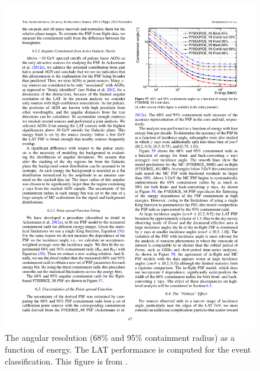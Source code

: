 \begin{figure}[htbp]
  \centering
  \includegraphics{chapters/introduction/figures/lat_psf.pdf}
  \caption{
  The angular resolution (68\% and 95\% containment radius)
  as a function of energy.
  The \ac{LAT} performance is computed for the \psevensourcevsix
  event classification.
  This figure is from \cite{ackermann_2012a_fermi-large}.
  }
\end{figure} 


